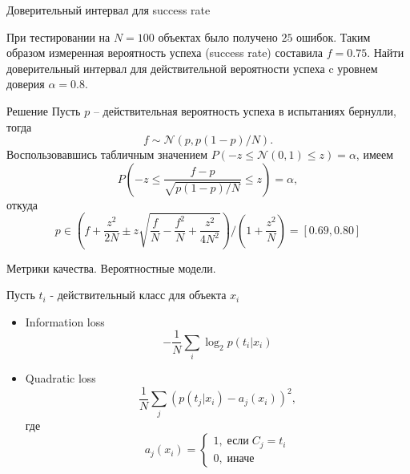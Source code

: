 \documentclass[10pt,a4paper]{beamer}
\begin{document}

\begin{frame}{Доверительный интервал для success rate}

При тестировании на $N=100$ объектах было получено $25$ ошибок. Таким образом измеренная вероятность успеха (success rate) составила $f=0.75$. Найти доверительный интервал для действительной вероятности успеха c уровнем доверия $\alpha=0.8$. 

\begin{exampleblock}{Решение}
Пусть $p$ -- действительная вероятность успеха в испытаниях бернулли, тогда
\[
f \sim \mathcal{N}\left( p, p(1-p)/N \right).
\]
Воспользовавшись табличным значением $P(-z \leq \mathcal{N}(0,1) \leq z) = \alpha$, имеем
\[
P\left(-z \leq \frac{f-p}{\sqrt{p(1-p)/N}} \leq z \right) = \alpha,
\]
откуда
\[
p \in \left(f + \frac{z^2}{2N} \pm z \sqrt{\frac f N - \frac{f^2}{N}+\frac{z^2}{4N^2}} \right)/\left(1 + \frac {z^2}{N} \right) = [0.69, 0.80]
\]
\end{exampleblock}
  
 \end{frame}
 

\begin{frame}{Метрики качества. Вероятностные модели.}

Пусть $t_i$ - действительный класс для объекта $x_i$
\begin{itemize}
\item  Information loss 
\[
- \frac 1 N \sum_i \log_2 p(t_i | x_i)
\]
\item Quadratic loss 
\[
\frac 1 N \sum_j (p(t_j | x_i) - a_j(x_i))^2,
\] 
где
\[
a_j(x_i) = \begin{cases}
1, \;\text{если}\;C_j = t_i\\
0, \;\text{иначе}
\end{cases} 
\]
\end{itemize}

\end{frame}

\end{document}
